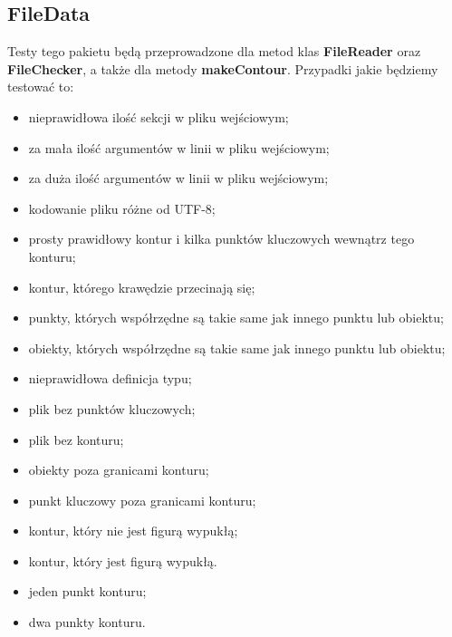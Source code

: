 \documentclass[a4paper,11pt]{article}
\begin{document}
\subsection{FileData}
Testy tego pakietu będą przeprowadzone dla metod klas \textbf{FileReader} oraz \textbf{FileChecker}, a także dla metody \textbf{makeContour}.
Przypadki jakie będziemy testować to:
\begin{itemize}
\item nieprawidłowa ilość sekcji w pliku wejściowym;
\item za mała ilość argumentów w linii w pliku wejściowym;
\item za duża ilość argumentów w linii w pliku wejściowym;
\item kodowanie pliku różne od UTF-8;
\item prosty prawidłowy kontur i kilka punktów kluczowych wewnątrz tego konturu;
\item kontur, którego krawędzie przecinają się;
\item punkty, których współrzędne są takie same jak innego punktu lub obiektu;
\item obiekty, których współrzędne są takie same jak innego punktu lub obiektu;
\item nieprawidłowa definicja typu;
\item plik bez punktów kluczowych;
\item plik bez konturu;
\item obiekty poza granicami konturu;
\item punkt kluczowy poza granicami konturu;
\item kontur, który nie jest figurą wypukłą;
\item kontur, który jest figurą wypukłą.
\item jeden punkt konturu;
\item dwa punkty konturu.
\end{itemize}
\end{document}
